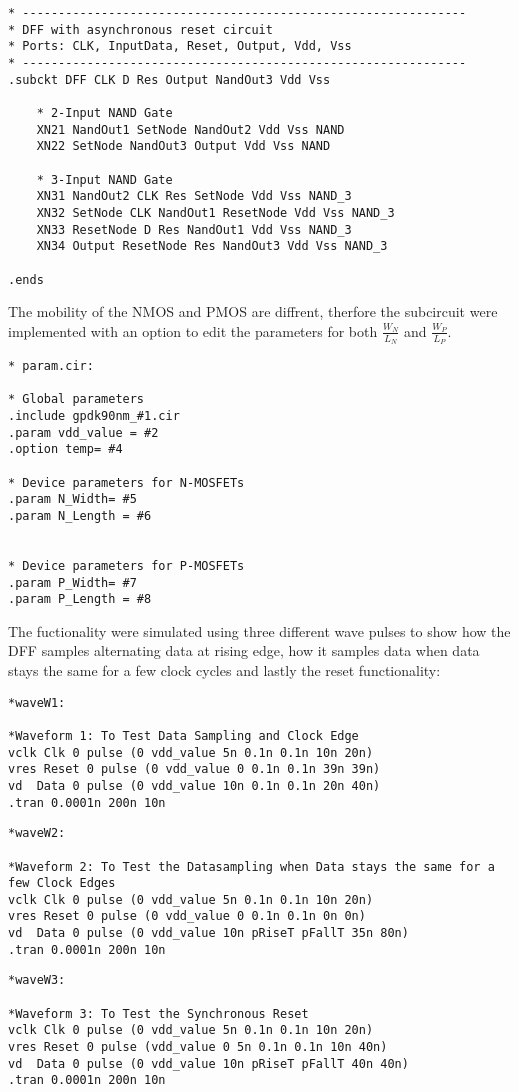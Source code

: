 \begin{lstlisting}
* --------------------------------------------------------------
* DFF with asynchronous reset circuit
* Ports: CLK, InputData, Reset, Output, Vdd, Vss
* --------------------------------------------------------------
.subckt DFF CLK D Res Output NandOut3 Vdd Vss

    * 2-Input NAND Gate
    XN21 NandOut1 SetNode NandOut2 Vdd Vss NAND
    XN22 SetNode NandOut3 Output Vdd Vss NAND

    * 3-Input NAND Gate
    XN31 NandOut2 CLK Res SetNode Vdd Vss NAND_3 
    XN32 SetNode CLK NandOut1 ResetNode Vdd Vss NAND_3 
    XN33 ResetNode D Res NandOut1 Vdd Vss NAND_3 
    XN34 Output ResetNode Res NandOut3 Vdd Vss NAND_3 

.ends
\end{lstlisting}

The mobility of the NMOS and PMOS are diffrent, therfore the subcircuit were implemented with an option to edit the parameters for both $\frac{W_N}{L_N}$ and $\frac{W_P}{L_P}$.


\begin{lstlisting}
* param.cir:

* Global parameters
.include gpdk90nm_#1.cir
.param vdd_value = #2
.option temp= #4

* Device parameters for N-MOSFETs
.param N_Width= #5
.param N_Length = #6


* Device parameters for P-MOSFETs
.param P_Width= #7
.param P_Length = #8
\end{lstlisting}

The fuctionality were simulated using three different wave pulses to show how the DFF samples alternating data at rising edge, how it samples data when data stays the same for a few clock cycles and lastly the reset functionality:

\begin{lstlisting}
*waveW1:

*Waveform 1: To Test Data Sampling and Clock Edge
vclk Clk 0 pulse (0 vdd_value 5n 0.1n 0.1n 10n 20n)     
vres Reset 0 pulse (0 vdd_value 0 0.1n 0.1n 39n 39n)       
vd  Data 0 pulse (0 vdd_value 10n 0.1n 0.1n 20n 40n)
.tran 0.0001n 200n 10n
\end{lstlisting}

\begin{lstlisting}
*waveW2:

*Waveform 2: To Test the Datasampling when Data stays the same for a few Clock Edges
vclk Clk 0 pulse (0 vdd_value 5n 0.1n 0.1n 10n 20n)     
vres Reset 0 pulse (0 vdd_value 0 0.1n 0.1n 0n 0n)       
vd  Data 0 pulse (0 vdd_value 10n pRiseT pFallT 35n 80n)     
.tran 0.0001n 200n 10n
\end{lstlisting}

\begin{lstlisting}
*waveW3:

*Waveform 3: To Test the Synchronous Reset
vclk Clk 0 pulse (0 vdd_value 5n 0.1n 0.1n 10n 20n)     
vres Reset 0 pulse (vdd_value 0 5n 0.1n 0.1n 10n 40n)       
vd  Data 0 pulse (0 vdd_value 10n pRiseT pFallT 40n 40n)
.tran 0.0001n 200n 10n
\end{lstlisting}

